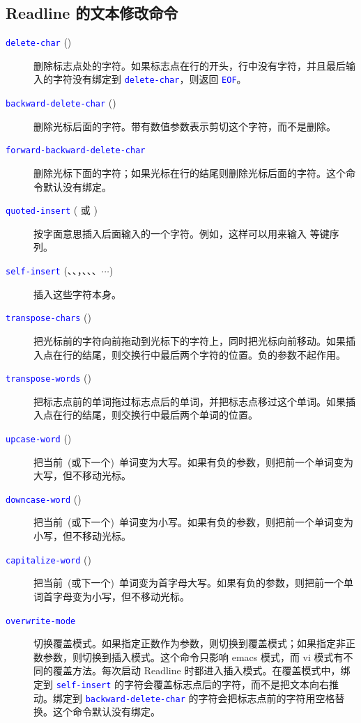 \documentclass[openany,notitlepage]{book}
\newcommand{\code}[1]{\textcolor{blue}{{\tt #1}}}
\begin{document}
\begin{CJK}{UTF8}{song}
\subsection{Readline 的文本修改命令} %
\begin{description}
    \item[\code{delete-char} ()] 删除标志点处的字符。如果标志点在行的开头，行中没有字符，并且最后输入的字符没有绑定到 \code{delete-char}，则返回 \code{EOF}。
    \item[\code{backward-delete-char} ()] 删除光标后面的字符。带有数值参数表示剪切这个字符，而不是删除。
    \item[\code{forward-backward-delete-char}] 删除光标下面的字符；如果光标在行的结尾则删除光标后面的字符。这个命令默认没有绑定。
    \item[\code{quoted-insert} ( 或 )] 按字面意思插入后面输入的一个字符。例如，这样可以用来输入  等键序列。
    \item[\code{self-insert} (、、，、、\keystroke{!}、$\cdots$)] 插入这些字符本身。
    \item[\code{transpose-chars} ()] 把光标前的字符向前拖动到光标下的字符上，同时把光标向前移动。如果插入点在行的结尾，则交换行中最后两个字符的位置。负的参数不起作用。
    \item[\code{transpose-words} ()] 把标志点前的单词拖过标志点后的单词，并把标志点移过这个单词。如果插入点在行的结尾，则交换行中最后两个单词的位置。
    \item[\code{upcase-word} ()] 把当前~(或下一个)~单词变为大写。如果有负的参数，则把前一个单词变为大写，但不移动光标。
    \item[\code{downcase-word} ()] 把当前~(或下一个)~单词变为小写。如果有负的参数，则把前一个单词变为小写，但不移动光标。
    \item[\code{capitalize-word} ()] 把当前~(或下一个)~单词变为首字母大写。如果有负的参数，则把前一个单词首字母变为小写，但不移动光标。
    \item[\code{overwrite-mode}] 切换覆盖模式。如果指定正数作为参数，则切换到覆盖模式；如果指定非正数参数，则切换到插入模式。这个命令只影响 emacs 模式，而 vi 模式有不同的覆盖方法。每次启动 Readline 时都进入插入模式。在覆盖模式中，绑定到 \code{self-insert}  的字符会覆盖标志点后的字符，而不是把文本向右推动。绑定到 \code{backward-delete-char} 的字符会把标志点前的字符用空格替换。这个命令默认没有绑定。
\end{description}


\end{CJK}
\end{document}
